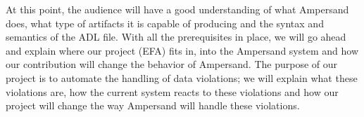 \documentclass[12pt]{article}
\begin{document}
 At this point, the audience will have a good understanding of what Ampersand does, what type of artifacts it is capable of producing and the syntax and semantics of the ADL file. With all the prerequisites in place, we will go ahead and explain where our project (EFA) fits in, into the Ampersand system and how our contribution will change the behavior of Ampersand. The purpose of our project is to automate the handling of data violations; we will explain what these violations are, how the current system reacts to these violations and how our project will change the way Ampersand will handle these violations.
 
% 
 
\end{document}
